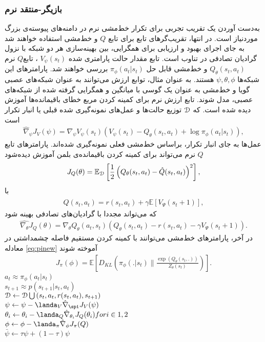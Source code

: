 \subsubsection{بازیگر-منتقد نرم}
به‌دست آوردن یک تقریب تجربی برای تکرار خط‌مشی نرم در دامنه‌های پیوسته‌ی بزرگ موردنیاز است.  در انتها، تقریب‌گرهای تابع برای تابع
$ Q$
و خط‌مشی استفاده خواهند شد به جای اجرای بهبود و ارزیابی برای همگرایی، بین بهینه‌سازی هر دو شبکه با نزول گرادیان تصادفی در تناوب است. تابع مقدار حالت پارامتری شده
$V_\psi (s_t)$
، تابع$Q$ نرم 
$Q_\theta (s_t,a_t)$
و خط‌مشی قابل حل 
$\pi_\phi (a_t | s_t)$
بررسی خواهند شد. پارامترهای این شبکه‌ها 
$\psi, \theta, \phi$
هستند. به عنوان مثال، توابع ارزش می‌توانند به عنوان شبکه‌های عصبی گویا و خط‌مشی به عنوان یک گوسی با میانگین و همگرایی گرفته شده از شبکه‌های عصبی، مدل شوند.
تابع ارزش نرم برای کمینه کردن مربع خطای باقیمانده‌ها آموزش دیده شده است.
که 
$\EuScript{D}$
توزیع حالت‌ها و عمل‌های نمونه‌گیری شده قبلی یا انبار تکرار
است
\begin{align}
\hat{\nabla}_\psi J_V (\psi) = \nabla_\psi V_\psi (s_t) (V_\psi (s_t)-Q_\theta(s_t,a_t)+\log \pi_\phi (a_t |s_t)) ,
\end{align}
عمل‌ها به جای انبار تکرار، براساس خط‌مشی فعلی نمونه‌گیری شده‌اند. پارامترهای تابع $Q$ نرم می‌تواند برای کمینه کردن باقیمانده‌ی بلمن آموزش دیده‌شود
\begin{align}
J_Q(\theta) = \mathbb{E}_{\EuScript{D}} \left[ \frac{1}{2} \left( Q_\theta (s_t,a_t)- \hat{Q} (s_t,a_t)\right)^2 \right] ,
\end{align}
با 
\begin{align*}
\hat{Q} (s_t,a_t) = r(s_t,a_t) + \gamma \mathbb{E} [V_\Psi (s_t+1)] ,
\end{align*}
که می‌تواند مجددا با گرادیان‌های تصادفی بهینه شود
\begin{align}
\hat{\nabla_{\theta}} J_Q (\theta) = \nabla_\theta Q_\theta (a_t,s_t) \left( Q_\theta (s_t,a_t)- r(s_t,a_t) - \gamma V_\Psi (s_t+1) \right). 
\label{eq:hatnabla}
\end{align}
در آخر، پارامترهای خط‌مشی می‌توانند با کمینه کردن مستقیم فاصله
چشمداشتی در معادله \ref{eq:pinew} آموخته شوند
\begin{align}
J_\pi(\phi) = \mathbb{E}\left[ D_{KL}  \left( \pi_\phi(.|s_t) \parallel \frac{\exp{(Q_{\theta} (s_t,.))}}{Z_{\theta} (s_t)}\right) \right].
\end{align}
$a_t \approx \pi_\phi(a_t|s_t)$ \\
$s_{t+1} \approx p(s_{t+1}|s_t,a_t)$\\
$\EuScript{D}\leftarrow \EuScript{D} \bigcup {(s_t,a_t,r(s_t,a_t),s_{t+1})}$ \\
$\psi \leftarrow \psi - \landa_V \hat{\nabla}_\spi J_V (\psi)$ \\
$\theta_i \leftarrow \theta_i - \landa_Q \hat{\nabla}_{\theta_i} J_Q(\theta_i) for i \in {1,2}$\\
$\phi \leftarrow \phi - \landa_\pi \hat{\nabla}_\phi J_\pi (Q)$ \\
$\bar{\psi} \leftarrow \tau \psi + (1-\tau) \psi$
